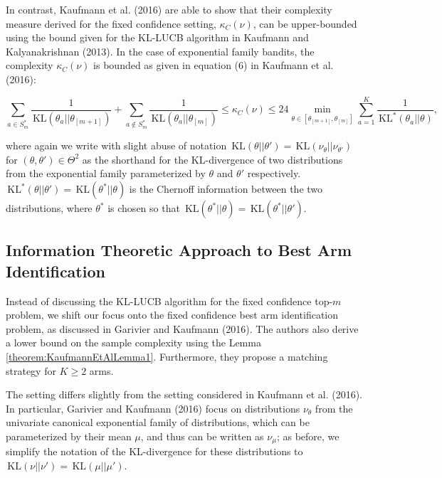 \documentclass[11pt,]{article}
\newcommand{\KL}{\,\text{KL}}
\begin{document}
In contrast, Kaufmann et al. (2016) are able to show that their
complexity measure derived for the fixed confidence setting,
\(\kappa_C(\nu)\), can be upper-bounded using the bound given for the
KL-LUCB algorithm in Kaufmann and Kalyanakrishnan (2013). In the case of
exponential family bandits, the complexity \(\kappa_C(\nu)\) is bounded
as given in equation (6) in Kaufmann et al. (2016):

\begin{equation*}
\sum_{a \in S^*_m} \frac{1}{\KL(\theta_a || \theta_{[m+1]})} + \sum_{a \notin S^*_m} \frac{1}{\KL(\theta_a || \theta_{[m]})} \leq \kappa_C(\nu) \leq 24 \min_{\theta \in [\theta_{[m+1]},\theta_{[m]}]} \sum_{a=1}^{K} \frac{1}{\KL^*(\theta_a || \theta)},
\end{equation*}

where again we write with slight abuse of notation
\(\KL(\theta || \theta') = \KL(\nu_{\theta}|| \nu_{\theta'})\) for
\((\theta, \theta') \in \Theta^2\) as the shorthand for the
KL-divergence of two distributions from the exponential family
parameterized by \(\theta\) and \(\theta'\) respectively.
\(\KL^*(\theta || \theta') = \KL(\theta^* || \theta)\) is the Chernoff
information between the two distributions, where \(\theta^*\) is chosen
so that \(\KL(\theta^* || \theta) = \KL(\theta^* || \theta')\).

\subsection{\texorpdfstring{Information Theoretic Approach to Best Arm
Identification
\label{sec:OptimalBestArmIdentification}}{Information Theoretic Approach to Best Arm Identification }}\label{information-theoretic-approach-to-best-arm-identification}

Instead of discussing the KL-LUCB algorithm for the fixed confidence
top-\(m\) problem, we shift our focus onto the fixed confidence best arm
identification problem, as discussed in Garivier and Kaufmann (2016).
The authors also derive a lower bound on the sample complexity using the
Lemma \autoref{theorem:KaufmannEtAlLemma1}. Furthermore, they propose a
matching strategy for \(K \geq 2\) arms.

The setting differs slightly from the setting considered in Kaufmann et
al. (2016). In particular, Garivier and Kaufmann (2016) focus on
distributions \(\nu_{\theta}\) from the univariate canonical exponential
family of distributions, which can be parameterized by their mean
\(\mu\), and thus can be written as \(\nu_{\mu}\); as before, we
simplify the notation of the KL-divergence for these distributions to
\(\KL(\nu || \nu') = \KL(\mu || \mu')\).
\end{document}

